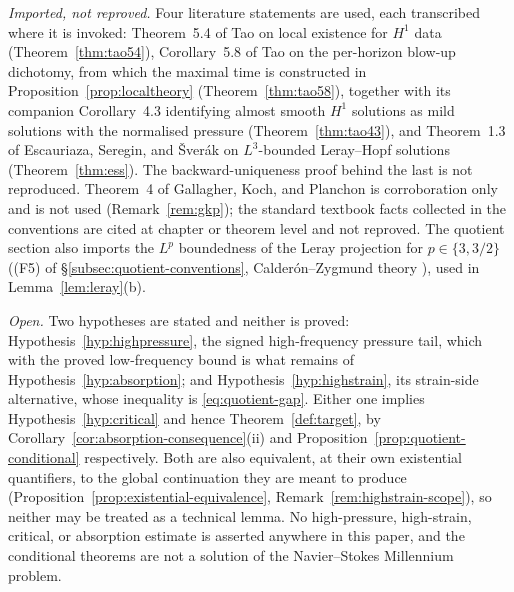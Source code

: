 \documentclass[11pt]{article}
\theoremstyle{definition}
\theoremstyle{plain}
\begin{document}
\emph{Imported, not reproved.}  Four literature statements are used, each
transcribed where it is invoked: Theorem~5.4 of Tao
\cite[pp.~52--53]{Tao2013} on local existence for $H^1$ data
(Theorem~\ref{thm:tao54}), Corollary~5.8 of Tao \cite[pp.~56--57]{Tao2013}
on the per-horizon blow-up dichotomy, from which the maximal time is
constructed in Proposition~\ref{prop:localtheory}
(Theorem~\ref{thm:tao58}), together with
its companion Corollary~4.3 \cite[p.~47]{Tao2013}
identifying almost smooth $H^1$ solutions as mild solutions with the
normalised pressure (Theorem~\ref{thm:tao43}), and Theorem~1.3 of Escauriaza, Seregin, and
\v Sver\'ak \cite[p.~214]{ESS2003} on $L^{3}$-bounded Leray--Hopf solutions
(Theorem~\ref{thm:ess}).  The backward-uniqueness proof behind the last is
not reproduced.  Theorem~4 of Gallagher, Koch, and Planchon
\cite{GKP2013} is corroboration only and is not used
(Remark~\ref{rem:gkp}); the standard textbook facts collected in the
conventions are cited at chapter or theorem level and not reproved.
The quotient section also imports the $L^p$ boundedness of the Leray
projection for $p\in\{3,3/2\}$ ((F5) of
\S\ref{subsec:quotient-conventions}, Calder\'on--Zygmund theory
\cite{Stein1970}), used in Lemma~\ref{lem:leray}(b).

\emph{Open.}  Two hypotheses are stated and neither is proved:
Hypothesis~\ref{hyp:highpressure}, the signed high-frequency pressure
tail, which with the proved low-frequency bound is what remains of
Hypothesis~\ref{hyp:absorption}; and Hypothesis~\ref{hyp:highstrain}, its
strain-side alternative, whose inequality is \eqref{eq:quotient-gap}.
Either one implies Hypothesis~\ref{hyp:critical} and hence
Theorem~\ref{def:target}, by
Corollary~\ref{cor:absorption-consequence}(ii) and
Proposition~\ref{prop:quotient-conditional} respectively.  Both are also
equivalent, at their own existential quantifiers, to the global
continuation they are meant to produce
(Proposition~\ref{prop:existential-equivalence},
Remark~\ref{rem:highstrain-scope}), so neither may be treated as a
technical lemma.  No high-pressure, high-strain, critical, or absorption
estimate is asserted anywhere in this paper, and the conditional theorems
are not a solution of the Navier--Stokes Millennium problem.
\end{document}
